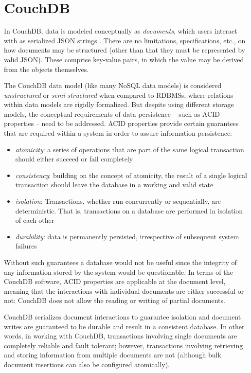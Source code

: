 \section{CouchDB}
In CouchDB, data is modeled conceptually as \textit{documents}, which users interact with as serialized JSON strings \cite{rfc7159}. There are no limitations, specifications, etc., on how documents may be structured (other than that they must be represented by valid JSON). These comprise key-value pairs, in which the value may be derived from the objects themselves.

The CouchDB data model (like many NoSQL data models) is considered \textit{unstructured} or \textit{semi-structured} when compared to RDBMSs, where relations within data models are rigidly formalized. But despite using different storage models, the conceptual requirements of data-persistence – such as ACID properties – need to be addressed. ACID properties provide certain guarantees that are required within a system in order to assure information persistence:

\begin{itemize}
    \item \textit{atomicity}: a series of operations that are part of the same logical transaction should either succeed or fail completely
    \item \textit{consistency}: building on the concept of atomicity, the result of a single logical transaction should leave the database in a working and valid state
    \item \textit{isolation}: Transactions, whether run concurrently or sequentially, are deterministic. That is, transactions on a database are performed in isolation of each other
    \item \textit{durability}: data is permanently persisted, irrespective of subsequent system failures
\end{itemize}

Without such guarantees a database would not be useful since the integrity of any information stored by the system would be questionable. In terms of the CouchDB software, ACID properties are applicable at the document level, meaning that the interactions with individual documents are either successful or not; CouchDB does not allow the reading or writing of partial documents.

CouchDB serializes document interactions to guarantee isolation and document writes are guaranteed to be durable and result in a consistent database. In other words, in working with CouchDB, transactions involving single documents are completely reliable and fault tolerant; however, transactions involving retrieving and storing information from multiple documents are not (although bulk document insertions can also be configured atomically).

